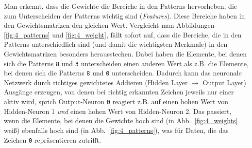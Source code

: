 Man erkennt, dass die Gewichte die Bereiche in den Patterns hervorheben, die zum Unterscheiden der Patterns wichtig sind (\emph{Features}). Diese Bereiche haben in den Gewichtsmatrizen den gleichen Wert. Vergleicht man Abbildungen \ref{fig:4_patterns} und \ref{fig:4_weight}, fällt sofort auf, dass die Bereiche, die in den Patterns unterschiedlich sind (und damit die wichtigsten Merkmale) in den Gewichtsmatrizen besonders herausstechen. Dabei haben die Elemente, bei denen sich die Patterns \texttt{8} und \texttt{3} unterscheiden einen anderen Wert als z.B. die Elemente, bei denen sich die Patterns \texttt{8} und \texttt{0} unterscheiden. Dadurch kann das neuronale Netzwerk durch richtiges gewichtetes Addieren (Hidden Layer $\rightarrow$ Output Layer) Ausgänge erzeugen, von denen bei richtig erkannten Zeichen jeweils nur einer aktiv wird, sprich Output-Neuron \texttt{0} reagiert z.B. auf einen hohen Wert von Hidden-Neuron 1 \emph{und} einen hohen Wert von Hidden-Neuron 2. Das passiert, wenn die Elemente, bei denen die Gewichte hoch sind (in Abb.~\ref{fig:4_weights} weiß) ebenfalls hoch sind (in Abb.~\ref{fig:4_patterns}), was für Daten, die das Zeichen \texttt{0} repräsentieren zutrifft.

